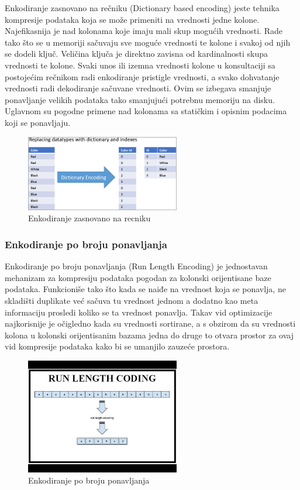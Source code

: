 \documentclass[12pt,oneside]{memoir}
\begin{document}
Enkodiranje zasnovano na rečniku (Dictionary based encoding) jeste tehnika kompresije podataka koja se može primeniti na vrednosti jedne kolone. Najefikasnija je nad kolonama koje imaju mali skup mogućih vrednosti. Rade tako što se u memoriji sačuvaju sve moguće vrednosti te kolone i svakoj od njih se dodeli ključ. Veličina ključa je direktno zavisna od kardinalnosti skupa vrednosti te kolone. Svaki unos ili izemna vrednosti kolone u konsultaciji sa postojećim rečnikom radi enkodiranje pristigle vrednosti, a svako dohvatanje vrednosti radi dekodiranje sačuvane vrednosti. Ovim se izbegava smanjuje ponavljanje velikih podataka tako smanjujući potrebnu memoriju na disku. Uglavnom su pogodne primene nad kolonama sa statičkim i opisnim podacima koji se ponavljaju.
\begin{figure}[!ht]
  \centering
  \includegraphics[width=0.6\textwidth]{DictionaryEncoding.jpg}
  \caption{Enkodiranje zasnovano na recniku}
  \label{fig:grafikon}
\end{figure}


\subsubsection{Enkodiranje po broju ponavljanja}

Enkodiranje po broju ponavljanja (Run Length Encoding) je jednostavan mehanizam za kompresiju podataka pogodan za kolonski orijentisane baze podataka. Funkcioniše tako što kada se naiđe na vrednost koja se ponavlja, ne skladišti duplikate već sačuva tu vrednost jednom a dodatno kao meta informaciju prosledi koliko se ta vrednost ponavlja. Takav vid optimizacije najkorisnije je očigledno kada su vrednosti sortirane, a s obzirom da su vrednosti kolona u kolonski orijentisanim bazama jedna do druge to otvara prostor za ovaj vid kompresije podataka kako bi se umanjilo zauzeće prostora.

\begin{figure}[!ht]
  \centering
  \includegraphics[width=0.6\textwidth]{run-length-encoding.jpg}
  \caption{Enkodiranje po broju ponavljanja}
  \label{fig:grafikon}
\end{figure}
\end{document}
